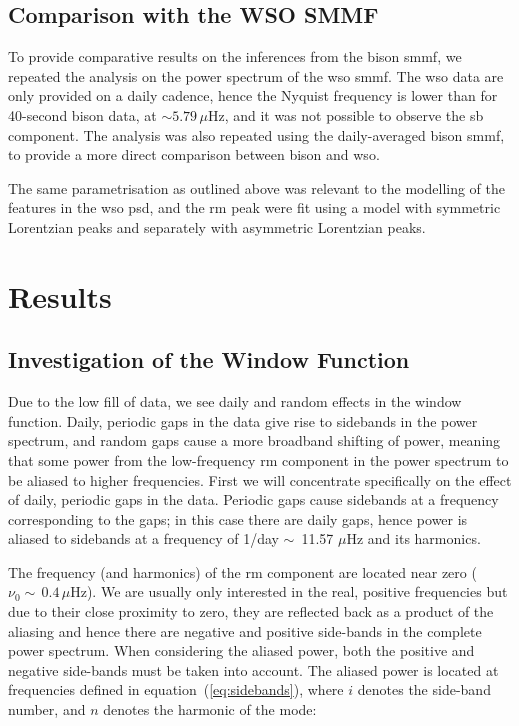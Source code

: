 \subsection{Comparison with the WSO SMMF}

To provide comparative results on the inferences from the \gls{bison} \gls{smmf}, we repeated the analysis on the power spectrum of the \gls{wso} \gls{smmf}. The \gls{wso} data are only provided on a daily cadence, hence the Nyquist frequency is lower than for 40-second \gls{bison} data, at $\sim 5.79 \, \mu\mathrm{Hz}$, and it was not possible to observe the \gls{sb} component. The analysis was also repeated using the daily-averaged \gls{bison} \gls{smmf}, to provide a more direct comparison between \gls{bison} and \gls{wso}.

The same parametrisation as outlined above was relevant to the modelling of the features in the \gls{wso} \gls{psd}, and the \gls{rm} peak were fit using a model with symmetric Lorentzian peaks and separately with asymmetric Lorentzian peaks.


\section{Results}\label{sec:SMMF_reults}

\subsection{Investigation of the Window Function}\label{sec:window_fn}


Due to the low fill of data, we see daily and random effects in the window function. Daily, periodic gaps in the data give rise to sidebands in the power spectrum, and random gaps cause a more broadband shifting of power, meaning that some power from the low-frequency \gls{rm} component in the power spectrum to be aliased to higher frequencies. First we will concentrate specifically on the effect of daily, periodic gaps in the data. Periodic gaps cause sidebands at a frequency corresponding to the gaps; in this case there are daily gaps, hence power is aliased to sidebands at a frequency of 1/day $\sim$~11.57 $\mu$Hz and its harmonics.

The frequency (and harmonics) of the \gls{rm} component are located near zero ($\nu_0 \sim \,0.4 \, \mu\mathrm{Hz}$). We are usually only interested in the real, positive frequencies but due to their close proximity to zero, they are reflected back as a product of the aliasing and hence there are negative and positive side-bands in the complete power spectrum. When considering the aliased power, both the positive and negative side-bands must be taken into account. The aliased power is located at frequencies defined in equation~(\ref{eq:sidebands}), where $i$ denotes the side-band number, and $n$ denotes the harmonic of the mode:


